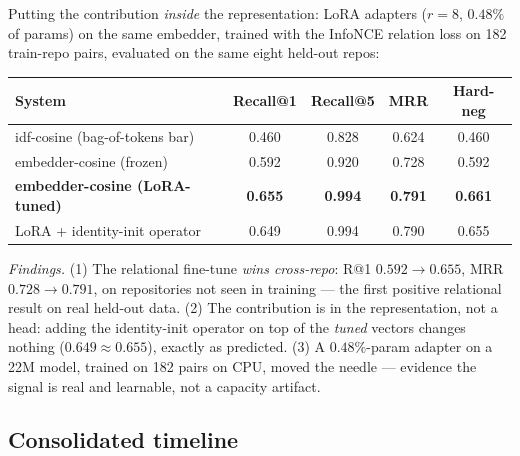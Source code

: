 \documentclass[11pt]{article}
\begin{document}
Putting the contribution \emph{inside} the representation: LoRA adapters ($r{=}8$,
$0.48\%$ of params) on the same embedder, trained with the InfoNCE relation loss on
182 train-repo pairs, evaluated on the same eight held-out repos:
\begin{center}
\begin{tabular}{lcccc}
\toprule
System & Recall@1 & Recall@5 & MRR & Hard-neg \\
\midrule
idf-cosine (bag-of-tokens bar) & 0.460 & 0.828 & 0.624 & 0.460 \\
embedder-cosine (frozen) & 0.592 & 0.920 & 0.728 & 0.592 \\
\textbf{embedder-cosine (LoRA-tuned)} & \textbf{0.655} & \textbf{0.994} & \textbf{0.791} & \textbf{0.661} \\
LoRA + identity-init operator & 0.649 & 0.994 & 0.790 & 0.655 \\
\bottomrule
\end{tabular}
\end{center}
\emph{Findings.} (1) The relational fine-tune \emph{wins cross-repo}: R@1 $0.592 \to
\mathbf{0.655}$, MRR $0.728 \to \mathbf{0.791}$, on repositories not seen in training
--- the first positive relational result on real held-out data. (2) The contribution
is in the representation, not a head: adding the identity-init operator on top of the
\emph{tuned} vectors changes nothing ($0.649 \approx 0.655$), exactly as predicted.
(3) A $0.48\%$-param adapter on a 22M model, trained on 182 pairs on CPU, moved the
needle --- evidence the signal is real and learnable, not a capacity artifact.

\subsection{Consolidated timeline}
\end{document}
